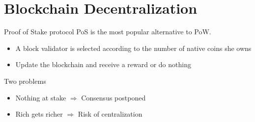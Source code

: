 \documentclass{beamer}
\begin{document}
\section{Blockchain Decentralization}
\begin{frame}{Proof of Stake protocol}
\scriptsize
PoS is the most popular alternative to PoW.
\begin{itemize}
  \item A block validator is selected according to the number of native coins she owns
  \item Update the blockchain and receive a reward or do nothing  
\end{itemize}
Two problems 
\begin{itemize}
  \item[\warning] Nothing at stake $\Rightarrow$ Consensus postponed
  \item[\warning] Rich gets richer $\Rightarrow$ Risk of centralization
\end{itemize}

\end{frame}
\end{document}
